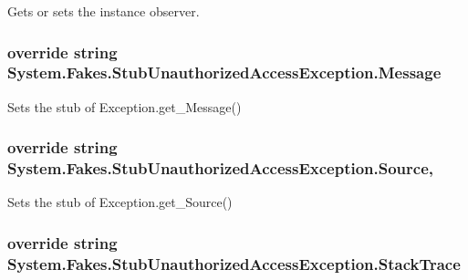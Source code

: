 Gets or sets the instance observer.

\hypertarget{class_system_1_1_fakes_1_1_stub_unauthorized_access_exception_aa8af6cd787cd996a01660351565dc0e9}{
\subsubsection[{Message}]{\setlength{\rightskip}{0pt plus 5cm}override string System.\-Fakes.\-Stub\-Unauthorized\-Access\-Exception.\-Message\hspace{0.3cm}{\ttfamily [get]}}}\label{class_system_1_1_fakes_1_1_stub_unauthorized_access_exception_aa8af6cd787cd996a01660351565dc0e9}


Sets the stub of Exception.\-get\-\_\-\-Message()

\hypertarget{class_system_1_1_fakes_1_1_stub_unauthorized_access_exception_a95c363c2f38fceee6220244974b0b439}{
\subsubsection[{Source}]{\setlength{\rightskip}{0pt plus 5cm}override string System.\-Fakes.\-Stub\-Unauthorized\-Access\-Exception.\-Source\hspace{0.3cm}{\ttfamily [get]}, {\ttfamily [set]}}}\label{class_system_1_1_fakes_1_1_stub_unauthorized_access_exception_a95c363c2f38fceee6220244974b0b439}


Sets the stub of Exception.\-get\-\_\-\-Source()

\hypertarget{class_system_1_1_fakes_1_1_stub_unauthorized_access_exception_a90dbdd3febdf1fd2d1d5a5a72461fff2}{
\subsubsection[{Stack\-Trace}]{\setlength{\rightskip}{0pt plus 5cm}override string System.\-Fakes.\-Stub\-Unauthorized\-Access\-Exception.\-Stack\-Trace\hspace{0.3cm}{\ttfamily [get]}}}\label{class_system_1_1_fakes_1_1_stub_unauthorized_access_exception_a90dbdd3febdf1fd2d1d5a5a72461fff2}


